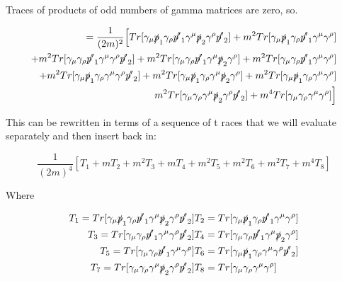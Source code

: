 \documentclass[a4]{article}
\begin{document}
    Traces of products of odd numbers of gamma matrices are zero, so.

    \begin{eqnarray}
        = \frac{1}{(2 m)^2} \Big[ Tr[ \gamma_\mu \slashed{p}_1 \gamma_\rho \slashed{p'}_1 \gamma^\mu \slashed{p}_2 \gamma^\rho \slashed{p'}_2] + m^2 Tr[\gamma_\mu \slashed{p}_1 \gamma_\rho \slashed{p'}_1 \gamma^\mu \gamma^\rho] \\
        + m^2 Tr[\gamma_\mu \gamma_\rho \slashed{p'}_1 \gamma^\mu \gamma^\rho \slashed{p'}_2] + m^2 Tr[\gamma_\mu \gamma_\rho \slashed{p'}_1 \gamma^\mu \slashed{p}_2 \gamma^\rho] + m^2 Tr[\gamma_\mu \gamma_\rho \slashed{p'}_1 \gamma^\mu \gamma^\rho] \\
        + m^2 Tr[\gamma_\mu \slashed{p}_1 \gamma_\rho \gamma^\mu \gamma^\rho \slashed{p'}_2] + m^2 Tr[\gamma_\mu \slashed{p}_1 \gamma_\rho \gamma^\mu \slashed{p}_2 \gamma^\rho] + m^2 Tr[\gamma_\mu \slashed{p}_1 \gamma_\rho \gamma^\mu \gamma^\rho] \\
        m^2 Tr[\gamma_\mu \gamma_\rho \gamma^\mu \slashed{p}_2 \gamma^\rho \slashed{p'}_2] + m^4 Tr[\gamma_\mu \gamma_\rho \gamma^\mu \gamma^\rho] \Big]
    \end{eqnarray}

    This can be rewritten in terms of a sequence of t races that we will evaluate separately and then insert back in:

    \begin{equation}
        \frac{1}{(2 m)^4} [T_1 + m T_2 + m^2 T_3 + m T_4 + m^2 T_5 + m^2 T_6 + m^2 T_7 + m^4 T_8]
    \end{equation}

    Where

    \begin{eqnarray}
        T_1 = Tr[ \gamma_\mu \slashed{p}_1 \gamma_\rho \slashed{p'}_1 \gamma^\mu \slashed{p}_2 \gamma^\rho \slashed{p'}_2] & T_2 = Tr[\gamma_\mu \slashed{p}_1 \gamma_\rho \slashed{p'}_1 \gamma^\mu \gamma^\rho] \\
        T_3 = Tr[\gamma_\mu \gamma_\rho \slashed{p'}_1 \gamma^\mu \gamma^\rho \slashed{p'}_2] & T_4 = Tr[\gamma_\mu \gamma_\rho \slashed{p'}_1 \gamma^\mu \slashed{p}_2 \gamma^\rho] \\
        T_5 = Tr[\gamma_\mu \gamma_\rho \slashed{p'}_1 \gamma^\mu \gamma^\rho] & T_6 = Tr[\gamma_\mu \slashed{p}_1 \gamma_\rho \gamma^\mu \gamma^\rho \slashed{p'}_2] \\
        T_7 = Tr[\gamma_\mu \gamma_\rho \gamma^\mu \slashed{p}_2 \gamma^\rho \slashed{p'}_2] & T_8 = Tr[\gamma_\mu \gamma_\rho \gamma^\mu \gamma^\rho] \\
    \end{eqnarray}
\end{document}
